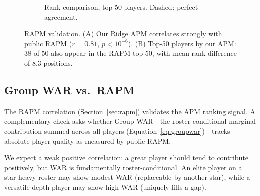 \documentclass[12pt,letterpaper]{article}
\begin{document}
\begin{figure}[htbp]
  \hfill
  \begin{subfigure}[t]{0.48\textwidth}
    \centering
    \caption{Rank comparison, top-50 players. Dashed: perfect agreement.}
    \label{fig:rapm-ranks}
  \end{subfigure}
  \caption{RAPM validation. (A) Our Ridge APM correlates strongly with
    public RAPM ($r = 0.81$, $p < 10^{-6}$). (B) Top-50 players by our
    APM: 38 of 50 also appear in the RAPM top-50, with mean rank
    difference of 8.3 positions.}
  \label{fig:rapm-validation}
\end{figure}

\subsection{Group WAR vs.\ RAPM}
\label{sec:war-rapm}

The RAPM correlation (Section~\ref{sec:rapm}) validates the APM ranking
signal.
A complementary check asks whether Group WAR---the roster-conditional
marginal contribution summed across all players (Equation~\ref{eq:groupwar})---tracks
absolute player quality as measured by public RAPM.

We expect a weak positive correlation: a great player should tend to
contribute positively, but WAR is fundamentally roster-conditional.
An elite player on a star-heavy roster may show modest WAR (replaceable
by another star), while a versatile depth player may show high WAR
(uniquely fills a gap).
\end{document}
